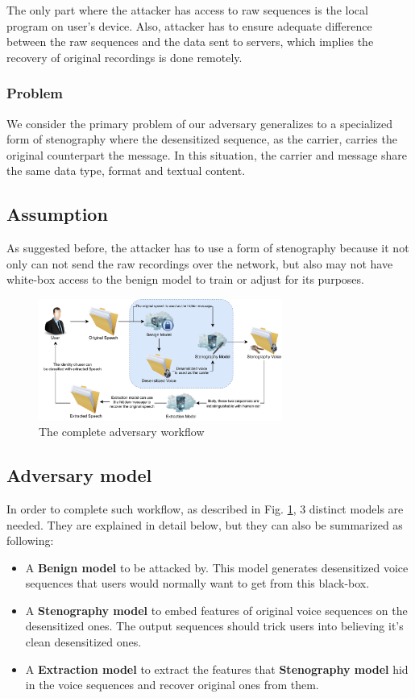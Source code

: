 \documentclass[journal]{IEEEtran} %
\begin{document}
The only part where the attacker has access to raw sequences is the local program on user's device. Also, attacker has to ensure adequate difference between the raw sequences and the data sent to servers, which implies the recovery of original recordings is done remotely.

\subsubsection{Problem}

We consider the primary problem of our adversary generalizes to a specialized form of stenography where the desensitized sequence, as the carrier, carries the original counterpart the message. In this situation, the carrier and message share the same data type, format and textual content.

\subsection{Assumption}

As suggested before, the attacker has to use a form of stenography because it not only can not send the raw recordings over the network, but also may not have white-box access to the benign model to train or adjust for its purposes.

\begin{figure}[htbp]
    \centerline{\includegraphics[width=8cm]{methodv3.png}}
    \caption{The complete adversary workflow}
    \label{method}
\end{figure}

\subsection{Adversary model}

In order to complete such workflow, as described in Fig. \ref{method}, 3 distinct models are needed. They are explained in detail below, but they can also be summarized as following:

\begin{itemize}
    \item A \textbf{Benign model} to be attacked by. This model generates desensitized voice sequences that users would normally want to get from this black-box.
    \item A \textbf{Stenography model} to embed features of original voice sequences on the desensitized ones. The output sequences should trick users into believing it's clean desensitized ones.
    \item A \textbf{Extraction model} to extract the features that \textbf{Stenography model} hid in the voice sequences and recover original ones from them.
\end{itemize}
\end{document}

